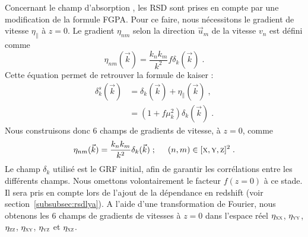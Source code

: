 \documentclass[11pt, twoside, a4paper, openright]{report}
\begin{document}
Concernant le champ d'absorption \lya{}, les RSD sont prises en compte par une modification de la formule FGPA. Pour ce faire, nous nécessitons le gradient de vitesse $\eta_{\parallel}$ à $z=0$. Le gradient $\eta_{nm}$ selon la direction $\vec u_m$ de la vitesse $v_n$ est défini comme
\begin{equation}
  \label{eq:eta1}
  \eta_{nm}(\vec k) = \frac{k_n k_m}{k^2} f \delta_k(\vec k) \; .
\end{equation}
Cette équation permet de retrouver la formule de kaiser :
\begin{align}
  \label{eq:kaiser5}
  \delta_k^s(\vec k) &= \delta_k(\vec k) + \eta_{\parallel}(\vec k) \; ,   \\
                     &= (1 + f \mu_k^2) \delta_k(\vec k)  \; .  \nonumber
\end{align}
Nous construisons donc 6 champs de gradients de vitesse, à $z=0$, comme
\begin{equation}
  \label{eq:eta2}
  \eta_{nm}(\vec k) = \frac{k_n k_m}{k^2} \delta_k(\vec k) \; ; \hspace{0.5cm} (n,m) \in [\textsc{x}, \textsc{y}, \textsc{z}]^2 \; .
\end{equation}
Le champ $\delta_k$ utilisé est le GRF initial, afin de garantir les corrélations entre les différents champs. Nous omettons volontairement le facteur $f(z=0)$ à ce stade. Il sera pris en compte lors de l'ajout de la dépendance en redshift (voir section~\ref{subsubsec:rsdlya}). A l'aide d'une transformation de Fourier, nous obtenons les 6 champs de gradients de vitesses  à $z = 0$ dans l'espace réel $\eta_{\textsc{xx}}$, $\eta_{\textsc{yy}}$, $\eta_{\textsc{zz}}$, $\eta_{\textsc{xy}}$, $\eta_{\textsc{yz}}$ et $\eta_{\textsc{xz}}$.




\end{document}
